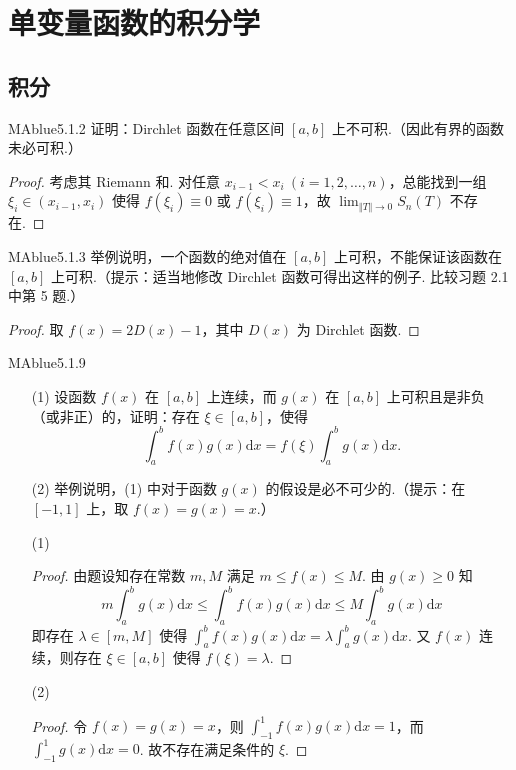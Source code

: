 \chapter{单变量函数的积分学}

\section{积分}

\begin{problem}{MAblue}{5.1.2}
    证明：Dirchlet 函数在任意区间 $[a, b]$ 上不可积.（因此有界的函数未必可积.）
\end{problem}

\begin{proof}
    考虑其 Riemann 和. 对任意 $x_{i-1} < x_i \ (i = 1, 2, \ldots, n)$，总能找到一组 $\xi_i \in (x_{i-1}, x_i)$ 使得 $f(\xi_i) \equiv 0$ 或 $f(\xi_i) \equiv 1$，故 $\lim_{\Vert T \Vert \to 0} S_n(T)$ 不存在.
\end{proof}

\begin{problem}{MAblue}{5.1.3}
    举例说明，一个函数的绝对值在 $[a, b]$ 上可积，不能保证该函数在 $[a, b]$ 上可积.（提示：适当地修改 Dirchlet 函数可得出这样的例子. 比较习题 2.1 中第 5 题.）
\end{problem}

\begin{proof}
    取 $f(x) = 2D(x) - 1$，其中 $D(x)$ 为 Dirchlet 函数.
\end{proof}

\begin{problem}{MAblue}{5.1.9}
    \begin{enumerate}
        \item[(1)]
        设函数 $f(x)$ 在 $[a, b]$ 上连续，而 $g(x)$ 在 $[a, b]$ 上可积且是非负（或非正）的，证明：存在 $\xi \in[a, b]$，使得
        \[
            \int_a^b f(x)g(x) \mathrm dx = f(\xi) \int_a^b g(x) \mathrm dx.
        \]
        \item[(2)]
        举例说明，(1) 中对于函数 $g(x)$ 的假设是必不可少的.（提示：在 $[-1, 1]$ 上，取 $f(x) = g(x) = x$.）
    \end{enumerate}
\end{problem}

\begin{enumerate}
    \item[(1)]
    \begin{proof}
        由题设知存在常数 $m, M$ 满足 $m \leqslant f(x) \leqslant M$. 由 $g(x) \geqslant 0$ 知
        \[
            m \int_a^b g(x) \mathrm dx \leqslant \int_a^b f(x)g(x) \mathrm dx \leqslant M \int_a^b g(x) \mathrm dx
        \]
        即存在 $\lambda \in [m, M]$ 使得 $\int_a^b f(x)g(x) \mathrm dx = \lambda \int_a^b g(x) \mathrm dx$. 又 $f(x)$ 连续，则存在 $\xi \in [a, b]$ 使得 $f(\xi) = \lambda$.
    \end{proof}
    \item[(2)]
    \begin{proof}
        令 $f(x) = g(x) = x$，则 $\int_{-1}^1 f(x)g(x) \mathrm dx = 1$，而 $\int_{-1}^1 g(x) \mathrm dx = 0$. 故不存在满足条件的 $\xi$.
    \end{proof}
\end{enumerate}

